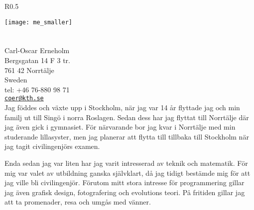 \documentclass[margin,line]{resume}%
\begin{document}
{\sc \Large {}}%
\begin{resume}
    \vspace{0.5cm}
    \begin{wrapfigure}{R}{0.5\textwidth}
         \vspace{-1cm}
        \begin{center}
        \texttt{[image: me\_smaller]}
        \end{center}
         \vspace{-1cm}
    \end{wrapfigure}

	   \section{}\vspace{0.001mm}
	   Carl-Oscar Erneholm\\
	   Bergsgatan 14 F 3 tr.  \\
	   761 42 Norrtälje  \\
	   Sweden \\
	   tel: +46 76-880 98 71\\
	   \href{mailto:coer@kth.se}{\texttt{coer@kth.se}} \\

	Jag föddes och växte upp i Stockholm, när jag var 14 år flyttade jag
	och min familj ut till Singö i norra Roslagen. Sedan dess har jag
	flyttat till Norrtälje där jag även gick i gymnasiet. För närvarande
	bor jag kvar i Norrtälje med min studerande lillasyster, men jag planerar att
	flytta till tillbaka till Stockholm när jag tagit civilingenjörs examen.

	Enda sedan jag var liten har jag varit intresserad av teknik och
	matematik. För mig var valet av utbildning ganska självklart, då
	jag tidigt bestämde mig för att jag ville bli civilingenjör.
	Förutom mitt stora intresse för programmering gillar jag även grafisk
	design, fotografering och evolutions teori. På fritiden gillar jag
	att ta promenader, resa och umgås med vänner.

	\section{}\vspace{0.001mm}


\end{resume}
\end{document}
